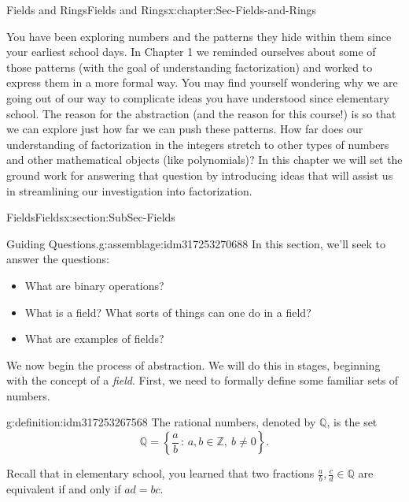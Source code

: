 \documentclass[oneside,10pt,]{book}
\numberwithin{equation}{section}
\newcommand{\setof}[2]{{\left\{#1\,\colon\,#2\right\}}}
\def\Z{{\mathbb Z}}
\def\Q{{\mathbb Q}}
\begin{document}
\begin{chapterptx}{Fields and Rings}{}{Fields and Rings}{}{}{x:chapter:Sec-Fields-and-Rings}
\begin{introduction}{}%
You have been exploring numbers and the patterns they hide within them since your earliest school days. In Chapter 1 we reminded ourselves about some of those patterns (with the goal of understanding factorization) and worked to express them in a more formal way. You may find yourself wondering why we are going out of our way to complicate ideas you have understood since elementary school. The reason for the abstraction (and the reason for this course!) is so that we can explore just how far we can push these patterns. How far does our understanding of factorization in the integers stretch to other types of numbers and other mathematical objects (like polynomials)? In this chapter we will set the ground work for answering that question by introducing ideas that will assist us in streamlining our investigation into factorization.%
\end{introduction}%
%
%
\typeout{************************************************}
\typeout{************************************************}
%
\begin{sectionptx}{Fields}{}{Fields}{}{}{x:section:SubSec-Fields}
\begin{assemblage}{Guiding Questions.}{g:assemblage:idm317253270688}%
In this section, we'll seek to answer the questions: %
\begin{itemize}[label=\textbullet]
\item{}What are binary operations?%
\item{}What is a field? What sorts of things can one do in a field?%
\item{}What are examples of fields?%
\end{itemize}
%
\end{assemblage}
We now begin the process of abstraction. We will do this in stages, beginning with the concept of a \emph{field}. First, we need to formally define some familiar sets of numbers.%
\begin{definition}{}{g:definition:idm317253267568}%
The rational numbers, denoted by \(\Q\), is the set%
\begin{equation*}
\Q = \setof{\frac{a}{b}}{a,b\in \Z, \ b\ne 0}\text{.}
\end{equation*}
%
\end{definition}
Recall that in elementary school, you learned that two fractions \(\frac{a}{b}, \frac{c}{d} \in \Q\) are equivalent if and only if \(ad=bc\).%

\end{sectionptx}
\end{chapterptx}
\end{document}
